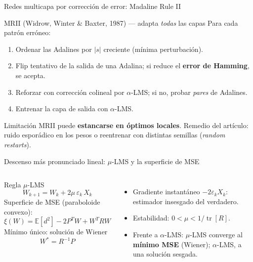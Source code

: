 \documentclass[aspectratio=169, 11pt, xcolor={dvipsnames,table}]{beamer}
\newcommand{\azul}[1]{\textcolor{UsachAzul}{#1}}
\begin{document}
\begin{frame}{Redes multicapa por corrección de error: Madaline Rule II}
\begin{block}{MRII (Widrow, Winter \& Baxter, 1987) --- adapta \emph{todas} las capas}
Para cada patrón erróneo:
\begin{enumerate}
  \item Ordenar las Adalines por $|s|$ creciente (mínima perturbación).
  \item \azul{Flip tentativo} de la salida de una Adalina; si reduce el \textbf{error de Hamming}, se acepta.
  \item Reforzar con corrección colineal por $\alpha$-LMS; si no, probar \emph{pares} de Adalines.
  \item Entrenar la capa de salida con $\alpha$-LMS.
\end{enumerate}
\end{block}
\begin{alertblock}{Limitación}
MRII puede \textbf{estancarse en óptimos locales}. Remedio del artículo: \azul{ruido esporádico} en
los pesos o reentrenar con distintas semillas (\emph{random restarts}).
\end{alertblock}
\end{frame}

\begin{frame}{Descenso más pronunciado lineal: $\mu$-LMS y la superficie de MSE}
\begin{columns}[T]
\begin{block}{Regla $\mu$-LMS}
\[ W_{k+1} = W_k + 2\mu\,\varepsilon_k\,X_k \]
Superficie de MSE (paraboloide \azul{convexo}):
\[ \xi(W)=\mathbb{E}[d^2]-2P^{T}W+W^{T}RW \]
Mínimo único: solución de Wiener
\[ W^{*}=R^{-1}P \]
\end{block}
\begin{itemize}
  \item Gradiente instantáneo $-2\varepsilon_k X_k$: estimador \azul{insesgado} del verdadero.
  \item Estabilidad: $0<\mu<1/\operatorname{tr}[R]$.
  \item Frente a $\alpha$-LMS: $\mu$-LMS converge al \textbf{mínimo MSE} (Wiener); $\alpha$-LMS, a una solución sesgada.
\end{itemize}
\end{columns}
\end{frame}
\end{document}
